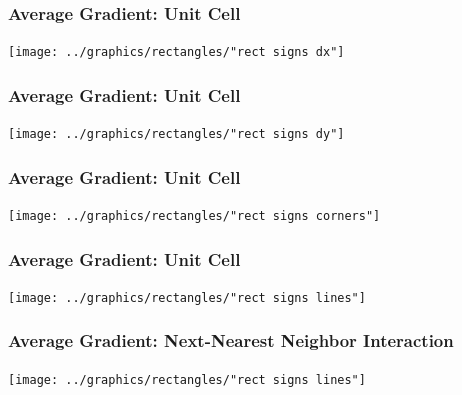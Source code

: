 \documentclass[]{beamer}
\begin{document}
\begin{frame}
  \frametitle{Average Gradient: Unit Cell}  %
  \begin{center}
    \texttt{[image: ../graphics/rectangles/"rect signs dx"]}
  \end{center}
\end{frame}

\begin{frame}
  \frametitle{Average Gradient: Unit Cell}  %
  \begin{center}
    \texttt{[image: ../graphics/rectangles/"rect signs dy"]}
  \end{center}
\end{frame}

\begin{frame}
  \frametitle{Average Gradient: Unit Cell}  %
  \begin{center}
    \texttt{[image: ../graphics/rectangles/"rect signs corners"]}
  \end{center}
\end{frame}

\begin{frame}
  \frametitle{Average Gradient: Unit Cell}  %
  \begin{center}
    \texttt{[image: ../graphics/rectangles/"rect signs lines"]}
  \end{center}
\end{frame}

\begin{frame}
  \frametitle{Average Gradient: Next-Nearest Neighbor Interaction}  %
  \begin{center}
    \texttt{[image: ../graphics/rectangles/"rect signs lines"]}
  \end{center}
\end{frame}
\end{document}
